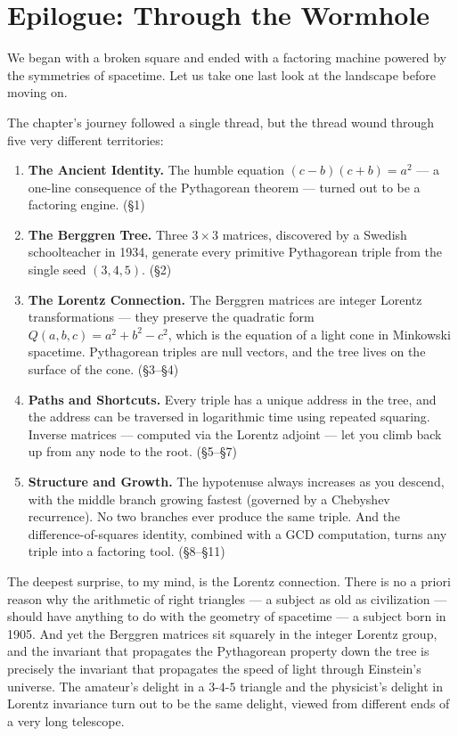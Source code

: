 \documentclass[11pt,twoside,openright]{book}
\theoremstyle{definition}
\theoremstyle{remark}
\begin{document}
\section{Epilogue: Through the Wormhole}

We began with a broken square and ended with a factoring machine powered by the symmetries of spacetime. Let us take one last look at the landscape before moving on.

The chapter's journey followed a single thread, but the thread wound through five very different territories:

\begin{enumerate}
  \item \textbf{The Ancient Identity.} The humble equation $(c - b)(c + b) = a^2$ --- a one-line consequence of the Pythagorean theorem --- turned out to be a factoring engine. (§1)

  \item \textbf{The Berggren Tree.} Three $3 \times 3$ matrices, discovered by a Swedish schoolteacher in 1934, generate every primitive Pythagorean triple from the single seed $(3, 4, 5)$. (§2)

  \item \textbf{The Lorentz Connection.} The Berggren matrices are integer Lorentz transformations --- they preserve the quadratic form $Q(a, b, c) = a^2 + b^2 - c^2$, which is the equation of a light cone in Minkowski spacetime. Pythagorean triples are null vectors, and the tree lives on the surface of the cone. (§3--§4)

  \item \textbf{Paths and Shortcuts.} Every triple has a unique address in the tree, and the address can be traversed in logarithmic time using repeated squaring. Inverse matrices --- computed via the Lorentz adjoint --- let you climb back up from any node to the root. (§5--§7)

  \item \textbf{Structure and Growth.} The hypotenuse always increases as you descend, with the middle branch growing fastest (governed by a Chebyshev recurrence). No two branches ever produce the same triple. And the difference-of-squares identity, combined with a GCD computation, turns any triple into a factoring tool. (§8--§11)
\end{enumerate}

The deepest surprise, to my mind, is the Lorentz connection. There is no a priori reason why the arithmetic of right triangles --- a subject as old as civilization --- should have anything to do with the geometry of spacetime --- a subject born in 1905. And yet the Berggren matrices sit squarely in the integer Lorentz group, and the invariant that propagates the Pythagorean property down the tree is precisely the invariant that propagates the speed of light through Einstein's universe. The amateur's delight in a $3$-$4$-$5$ triangle and the physicist's delight in Lorentz invariance turn out to be the same delight, viewed from different ends of a very long telescope.
\end{document}
